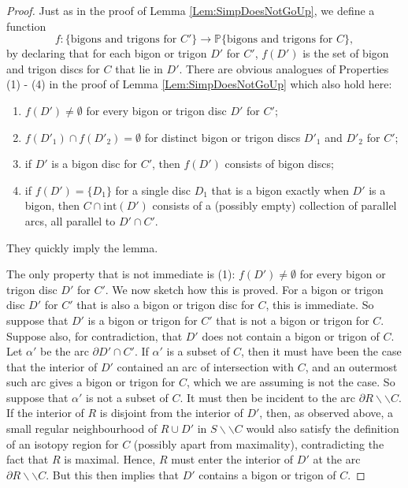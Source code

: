 \documentclass[oneside]{amsart}
\numberwithin{equation}{section}
\theoremstyle{plain}
\theoremstyle{definition}
\newcommand{\cut}{\backslash\backslash}
\begin{document}
\begin{proof}
Just as in the proof of Lemma \ref{Lem:SimpDoesNotGoUp}, we define a function 
$$f \colon \{ \text{bigons and trigons for } C' \} \rightarrow \mathbb{P} \{ \text{bigons and trigons for } C \},$$
by declaring that for each bigon or trigon $D'$ for $C'$, $f(D')$ is the set of bigon and trigon discs for $C$ that lie in $D'$. There are obvious analogues of Properties (1) - (4) in the proof of Lemma \ref{Lem:SimpDoesNotGoUp} which also hold here:
\begin{enumerate}
\item $f(D') \not= \emptyset$ for every bigon or trigon disc $D'$ for $C'$;
\item $f(D'_1) \cap f(D'_2) = \emptyset$ for distinct bigon or trigon discs $D'_1$ and $D'_2$ for $C'$;
\item if $D'$ is a bigon disc for $C'$, then $f(D')$ consists of bigon discs;
\item if $f(D') = \{ D_1 \}$ for a single disc $D_1$ that is a bigon exactly when $D'$ is a bigon, then $C\cap \mathrm{int}(D')$ consists of a (possibly empty) collection of parallel arcs, all parallel to $D' \cap C'$.
\end{enumerate}
They quickly imply the lemma. 

The only property that is not immediate is (1): $f(D') \not= \emptyset$ for every bigon or trigon disc $D'$ for $C'$. We now sketch how this is proved.
For a bigon or trigon disc $D'$ for $C'$ that is also a bigon or trigon disc for $C$, this is immediate. So suppose that $D'$ is a bigon or trigon for $C'$ that is not a bigon or trigon for $C$. Suppose also, for contradiction, that $D'$ does not contain a bigon or trigon of $C$. Let $\alpha'$ be the arc $\partial D' \cap C'$. If $\alpha'$ is a subset of $C$, then it must have been the case that the interior of $D'$ contained an arc of intersection with $C$, and an outermost such arc gives a bigon or trigon for $C$, which we are assuming is not the case. So suppose that $\alpha'$ is not a subset of $C$. It must then be incident to the arc $\partial R \cut C$. If the interior of $R$ is disjoint from the interior of $D'$, then, as observed above, a small regular neighbourhood of $R \cup D'$ in $S \cut C$ would also satisfy the definition of an isotopy region for $C$ (possibly apart from maximality), contradicting the fact that $R$ is maximal. Hence, $R$ must enter the interior of $D'$ at the arc $\partial R \cut C$. But this then implies that $D'$ contains a bigon or trigon of $C$. \end{proof}
\end{document}
